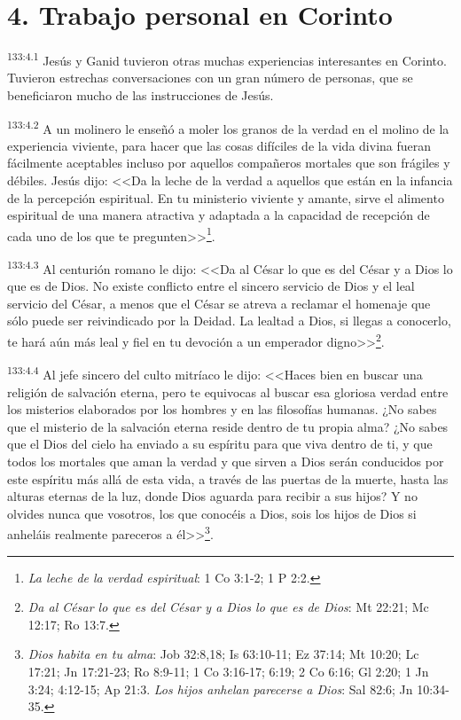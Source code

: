 \section*{4. Trabajo personal en Corinto}
\par 
\textsuperscript{133:4.1} Jesús y Ganid tuvieron otras muchas experiencias interesantes en Corinto. Tuvieron estrechas conversaciones con un gran número de personas, que se beneficiaron mucho de las instrucciones de Jesús.

\par 
\textsuperscript{133:4.2} A un molinero le enseñó a moler los granos de la verdad en el molino de la experiencia viviente, para hacer que las cosas difíciles de la vida divina fueran fácilmente aceptables incluso por aquellos compañeros mortales que son frágiles y débiles. Jesús dijo: <<Da la leche de la verdad a aquellos que están en la infancia de la percepción espiritual. En tu ministerio viviente y amante, sirve el alimento espiritual de una manera atractiva y adaptada a la capacidad de recepción de cada uno de los que te pregunten>>\footnote{\textit{La leche de la verdad espiritual}: 1 Co 3:1-2; 1 P 2:2.}.

\par 
\textsuperscript{133:4.3} Al centurión romano le dijo: <<Da al César lo que es del César y a Dios lo que es de Dios. No existe conflicto entre el sincero servicio de Dios y el leal servicio del César, a menos que el César se atreva a reclamar el homenaje que sólo puede ser reivindicado por la Deidad. La lealtad a Dios, si llegas a conocerlo, te hará aún más leal y fiel en tu devoción a un emperador digno>>\footnote{\textit{Da al César lo que es del César y a Dios lo que es de Dios}: Mt 22:21; Mc 12:17; Ro 13:7.}.

\par 
\textsuperscript{133:4.4} Al jefe sincero del culto mitríaco le dijo: <<Haces bien en buscar una religión de salvación eterna, pero te equivocas al buscar esa gloriosa verdad entre los misterios elaborados por los hombres y en las filosofías humanas. ¿No sabes que el misterio de la salvación eterna reside dentro de tu propia alma? ¿No sabes que el Dios del cielo ha enviado a su espíritu para que viva dentro de ti, y que todos los mortales que aman la verdad y que sirven a Dios serán conducidos por este espíritu más allá de esta vida, a través de las puertas de la muerte, hasta las alturas eternas de la luz, donde Dios aguarda para recibir a sus hijos? Y no olvides nunca que vosotros, los que conocéis a Dios, sois los hijos de Dios si anheláis realmente pareceros a él>>\footnote{\textit{Dios habita en tu alma}: Job 32:8,18; Is 63:10-11; Ez 37:14; Mt 10:20; Lc 17:21; Jn 17:21-23; Ro 8:9-11; 1 Co 3:16-17; 6:19; 2 Co 6:16; Gl 2:20; 1 Jn 3:24; 4:12-15; Ap 21:3. \textit{Los hijos anhelan parecerse a Dios}: Sal 82:6; Jn 10:34-35.}.

